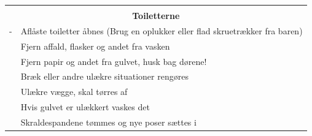 \documentclass[a4paper,10pt,oneside,article]{memoir}
\begin{document}
\newpage
\vspace{0.5cm}
\noindent
\begin{tabular}{|l|l|}
    \hline
    \multicolumn{2}{|c|}{} \\
    \multicolumn{2}{|c|}{\Large \textbf{Toiletterne}} \\
    \hline
    \begin{minipage}[t]{0.15\textwidth}
        {\color{white}-}
    \end{minipage} & 
    \begin{minipage}[t]{0.80\textwidth}
        Aflåste toiletter åbnes (Brug en oplukker eller flad skruetrækker fra baren)
    \end{minipage} \\
    \hline
    \begin{minipage}[t]{0.15\textwidth}
    \end{minipage} & 
    \begin{minipage}[t]{0.80\textwidth}
        Fjern affald, flasker og andet fra vasken
    \end{minipage} \\
    \hline
    \begin{minipage}[t]{0.15\textwidth}
    \end{minipage} & 
    \begin{minipage}[t]{0.80\textwidth}
        Fjern papir og andet fra gulvet, husk bag dørene!
    \end{minipage} \\
    \hline
    \begin{minipage}[t]{0.15\textwidth}
    \end{minipage} & 
    \begin{minipage}[t]{0.80\textwidth}
        Bræk eller andre ulækre situationer rengøres
    \end{minipage} \\
    \hline
    \begin{minipage}[t]{0.15\textwidth}
    \end{minipage} & 
    \begin{minipage}[t]{0.80\textwidth}
        Ulækre vægge, skal tørres af
    \end{minipage} \\
    \hline
    \begin{minipage}[t]{0.15\textwidth}
    \end{minipage} & 
    \begin{minipage}[t]{0.80\textwidth}
        Hvis gulvet er ulækkert vaskes det
    \end{minipage} \\
    \hline
    \begin{minipage}[t]{0.15\textwidth}
    \end{minipage} & 
    \begin{minipage}[t]{0.80\textwidth}
        Skraldespandene tømmes og nye poser sættes i 
    \end{minipage} \\
    \hline
\end{tabular}
\end{document}

